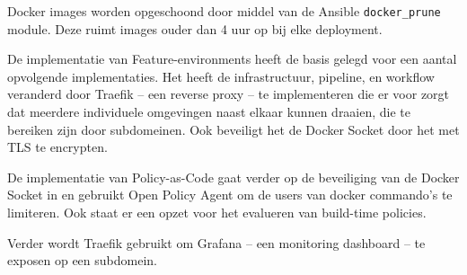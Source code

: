 Docker images worden opgeschoond door middel van de Ansible \texttt{docker\_prune} module. Deze ruimt images ouder dan 4 uur op bij elke deployment.

De implementatie van Feature-environments heeft de basis gelegd voor een aantal opvolgende implementaties. Het heeft de infrastructuur, pipeline, en workflow veranderd door Traefik -- een reverse proxy -- te implementeren die er voor zorgt dat meerdere individuele omgevingen naast elkaar kunnen draaien, die te bereiken zijn door subdomeinen. Ook beveiligt het de Docker Socket door het met TLS te encrypten. 

De implementatie van Policy-as-Code gaat verder op de beveiliging van de Docker Socket in en gebruikt Open Policy Agent om de users van docker commando's te limiteren. Ook staat er een opzet voor het evalueren van build-time policies.

Verder wordt Traefik gebruikt om Grafana -- een monitoring dashboard -- te exposen op een subdomein.
